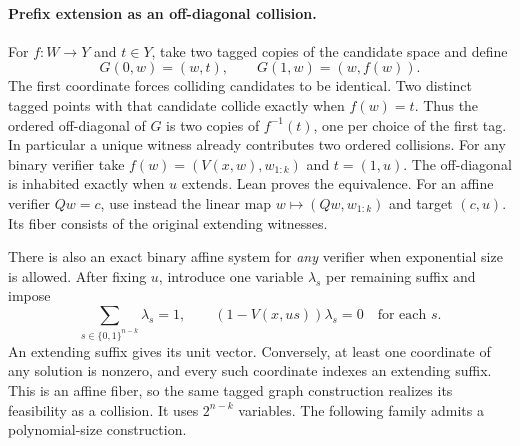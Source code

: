 \paragraph{Prefix extension as an off-diagonal collision.}
For \(f:W\to Y\) and \(t\in Y\), take two tagged copies of the candidate
space and define
\[
 G(0,w)=(w,t),\qquad G(1,w)=(w,f(w)).
\]
The first coordinate forces colliding candidates to be identical. Two
distinct tagged points with that candidate collide exactly when
\(f(w)=t\). Thus the ordered off-diagonal of \(G\) is two copies of
\(f^{-1}(t)\), one per choice of the first tag. In particular a unique
witness already contributes two ordered collisions. For any binary
verifier take \(f(w)=(V(x,w),w_{1:k})\) and \(t=(1,u)\). The
off-diagonal is inhabited exactly when \(u\) extends. Lean proves the
equivalence. For an affine verifier \(Qw=c\), use instead the linear
map \(w\mapsto(Qw,w_{1:k})\) and target \((c,u)\). Its fiber consists
of the original extending witnesses.

There is also an exact binary affine system for \emph{any} verifier
when exponential size is allowed. After fixing \(u\), introduce one
variable \(\lambda_s\) per remaining suffix and impose
\[
 \sum_{s\in\{0,1\}^{n-k}}\lambda_s=1,\qquad
 (1-V(x,us))\lambda_s=0\quad\text{for each }s .
\]
An extending suffix gives its unit vector. Conversely, at least one
coordinate of any solution is nonzero, and every such coordinate
indexes an extending suffix. This is an affine fiber, so the same
tagged graph construction realizes its feasibility as a collision.
It uses \(2^{n-k}\) variables. The following family admits a
polynomial-size construction.

